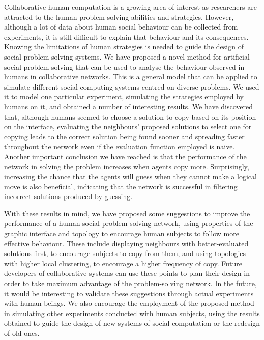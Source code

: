 \documentclass{article}
\begin{document}
Collaborative human computation is a growing area of interest as researchers are attracted to the human problem-solving abilities and strategies. However, although a lot of data about human social behaviour can be collected from experiments, it is still difficult to explain that behaviour and its consequences. Knowing the limitations of human strategies is needed to guide the design of social problem-solving systems. We have proposed a novel method for artificial social problem-solving that can be used to analyse the behaviour observed in humans in collaborative networks. This is a general model that can be applied to simulate different social computing systems centred on diverse problems. We used it to model one particular experiment, simulating the strategies employed by humans on it, and obtained a number of interesting results. We have discovered that, although humans seemed to choose a solution to copy based on its position on the interface, evaluating the neighbours' proposed solutions to select one for copying leads to the correct solution being found sooner and spreading faster throughout the network even if the evaluation function employed is naive. Another important conclusion we have reached is that the performance of the network in solving the problem increases when agents copy more. Surprisingly, increasing the chance that the agents will guess when they cannot make a logical move is also beneficial, indicating that the network is successful in filtering incorrect solutions produced by guessing.

With these results in mind, we have proposed some suggestions to improve the performance of a human social problem-solving network, using properties of the graphic interface and topology to encourage human subjects to follow more effective behaviour. These include displaying neighbours with better-evaluated solutions first, to encourage subjects to copy from them, and using topologies with higher local clustering, to encourage a higher frequency of copy. Future developers of collaborative systems can use these points to plan their design in order to take maximum advantage of the problem-solving network. In the future, it would be interesting to validate these suggestions through actual experiments with human beings. We also encourage the employment of the proposed method in simulating other experiments conducted with human subjects, using the results obtained to guide the design of new systems of social computation or the redesign of old ones.



\end{document}

